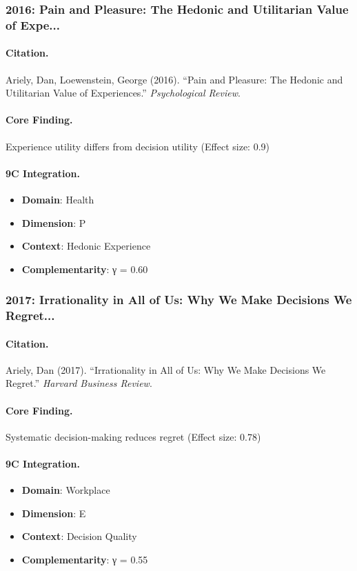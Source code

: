 \subsubsection{2016: Pain and Pleasure: The Hedonic and Utilitarian Value of Expe...}

\paragraph{Citation.}
Ariely, Dan, Loewenstein, George (2016). ``Pain and Pleasure: The Hedonic and Utilitarian Value of Experiences.''
\textit{Psychological Review}.

\paragraph{Core Finding.}
Experience utility differs from decision utility (Effect size: 0.9)

\paragraph{9C Integration.}
\begin{itemize}[nosep]
  \item \textbf{Domain}: Health
  \item \textbf{Dimension}: P
  \item \textbf{Context}: Hedonic Experience
  \item \textbf{Complementarity}: γ = 0.60
\end{itemize}

\subsubsection{2017: Irrationality in All of Us: Why We Make Decisions We Regret...}

\paragraph{Citation.}
Ariely, Dan (2017). ``Irrationality in All of Us: Why We Make Decisions We Regret.''
\textit{Harvard Business Review}.

\paragraph{Core Finding.}
Systematic decision-making reduces regret (Effect size: 0.78)

\paragraph{9C Integration.}
\begin{itemize}[nosep]
  \item \textbf{Domain}: Workplace
  \item \textbf{Dimension}: E
  \item \textbf{Context}: Decision Quality
  \item \textbf{Complementarity}: γ = 0.55
\end{itemize}

